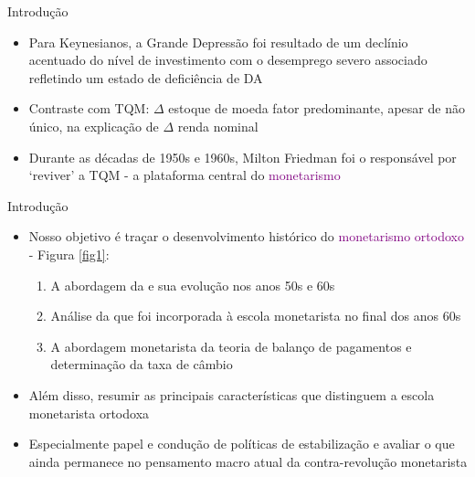 \documentclass[10pt]{beamer}
\begin{document}
\begin{frame}{Introdução}
    \begin{itemize}
        \item Para Keynesianos, a Grande Depressão foi resultado de um declínio acentuado do nível de investimento com o desemprego severo associado refletindo um estado de deficiência de DA
        \bigskip
        \item Contraste com TQM: $\Delta$ estoque de moeda fator predominante, apesar de não único, na explicação de $\Delta$ renda nominal
        \bigskip
        \item Durante as décadas de 1950s e 1960s, Milton Friedman foi o responsável por `reviver' a TQM - a plataforma central do \textcolor{purple}{monetarismo}
    \end{itemize}
\end{frame}

\begin{frame}{Introdução}
    \begin{itemize}
        \item Nosso objetivo é traçar o desenvolvimento histórico do \textcolor{purple}{monetarismo ortodoxo} - Figura \ref{fig1}:
        \bigskip
        \begin{enumerate}
            \item A abordagem da  e sua evolução nos anos 50s e 60s
            \medskip
            \item Análise da  que foi incorporada à escola monetarista no final dos anos 60s
            \medskip
            \item A abordagem monetarista da teoria de balanço de pagamentos e determinação da taxa de câmbio
        \end{enumerate}
        \bigskip
        \item Além disso, resumir as principais características que distinguem a escola monetarista ortodoxa
        \bigskip
        \item Especialmente papel e condução de políticas de estabilização e avaliar o que ainda permanece no pensamento macro atual da contra-revolução monetarista
    \end{itemize}
\end{frame}
\end{document}
